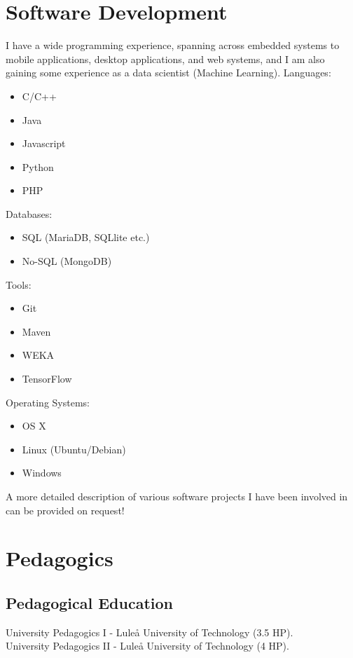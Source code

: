 \documentclass{article}
\begin{document}
\section{Software Development}
I have a wide programming experience, spanning across embedded systems to mobile applications, desktop applications, and web systems, and I am also gaining some experience as a data scientist (Machine Learning).
\newline
\newline
Languages:
\begin{itemize}
    \item C/C++
    \item Java
    \item Javascript
    \item Python
    \item PHP
\end{itemize}
\newline
Databases:
\begin{itemize}
    \item SQL (MariaDB, SQLlite etc.)
    \item No-SQL (MongoDB)
\end{itemize}
\newline
Tools:
\begin{itemize}
    \item Git
    \item Maven
    \item WEKA
    \item TensorFlow
\end{itemize}
\newline
Operating Systems:
\begin{itemize}
    \item OS X
    \item Linux (Ubuntu/Debian)
    \item Windows
\end{itemize}

A more detailed description of various software projects I have been involved in can be provided on request!

\newpage
\section{Pedagogics}
\subsection{Pedagogical Education}
University Pedagogics I - Luleå University of Technology (3.5 HP).\\
University Pedagogics II - Luleå University of Technology (4 HP).
\end{document}

